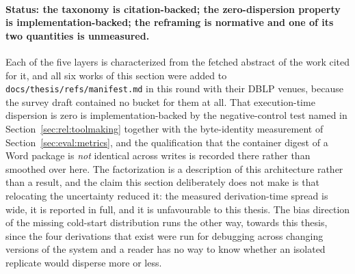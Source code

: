 \paragraph{Status: the taxonomy is citation-backed; the zero-dispersion property is
implementation-backed; the reframing is normative and one of its two quantities is unmeasured.}
Each of the five layers is characterized from the fetched abstract of the work cited for it,
and all six works of this section were added to \texttt{docs/thesis/refs/manifest.md} in this
round with their DBLP venues, because the survey draft contained no bucket for them at all.
That execution-time dispersion is zero is implementation-backed by the negative-control test
named in Section~\ref{sec:rel:toolmaking} together with the byte-identity measurement of
Section~\ref{sec:eval:metrics}, and the qualification that the container digest of a Word
package is \emph{not} identical across writes is recorded there rather than smoothed over here.
The factorization is a description of this architecture rather than a result, and the claim
this section deliberately does not make is that relocating the uncertainty reduced it: the
measured derivation-time spread is wide, it is reported in full, and it is unfavourable to this
thesis. The bias direction of the missing cold-start distribution runs the other way, towards
this thesis, since the four derivations that exist were run for debugging across changing
versions of the system and a reader has no way to know whether an isolated replicate would
disperse more or less.
